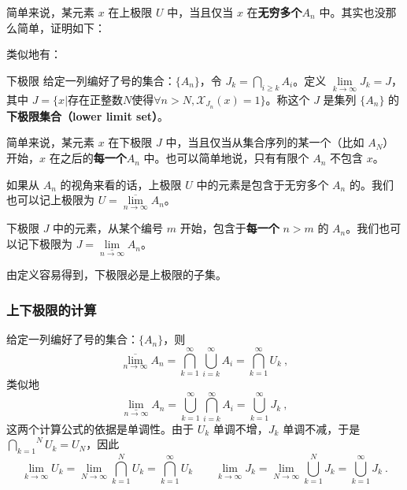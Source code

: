 简单来说，某元素 $x$ 在上极限 $U$ 中，当且仅当 $x$ 在\textbf{无穷多个}$A_n$ 中。其实也没那么简单，证明如下：



类似地有：

\begin{definition}{下极限}
给定一列编好了号的集合：$\{A_n\}$，令 $J_k=\underset{i\ge k}{\bigcap} A_i$。定义 $\lim\limits_{k\to\infty} J_k=J$，其中 $J=\{x|\text{存在正整数}N\text{使得}\forall n>N, \mathcal{X}_{J_n}(x)=1\}$。称这个 $J$ 是集列 $\{A_n\}$ 的\textbf{下极限集合（lower limit set）}。
\end{definition}

简单来说，某元素 $x$ 在下极限 $J$ 中，当且仅当从集合序列的某一个（比如 $A_N$）开始，$x$ 在之后的\textbf{每一个}$A_n$ 中。也可以简单地说，只有有限个 $A_n$ 不包含 $x$。

如果从 $A_n$ 的视角来看的话，上极限 $U$ 中的元素是包含于无穷多个 $A_n$ 的。我们也可以记上极限为 $U=\underset{n\to \infty}{\overline{\lim}} A_n$。

下极限 $J$ 中的元素，从某个编号 $m$ 开始，包含于\textbf{每一个} $n>m$ 的 $A_n$。我们也可以记下极限为 $J=\underset{n\to \infty}{\underline{\lim}}A_n$。

由定义容易得到，下极限必是上极限的子集。

\subsubsection{上下极限的计算}
给定一列编好了号的集合：$\{A_n\}$，则
\begin{equation}
\underset{n\to \infty}{\overline{\lim}} A_n = \overset {\infty}{\underset{k=1}{\bigcap}} \overset{\infty}{\underset{i=k}{\bigcup}} A_i = \overset{\infty}{\underset{k=1}{\bigcap}} U_k~,
\end{equation}
类似地
\begin{equation}
\underset{n\to \infty}{\underline{\lim}}A_n=\overset{\infty}{\underset{k=1}{\bigcup}}\overset{\infty}{\underset{i=k}{\bigcap}} A_i=\overset{\infty} {\underset{k=1}{\bigcup}} J_k~,
\end{equation}
这两个计算公式的依据是单调性。由于 $U_k$ 单调不增，$J_k$ 单调不减，于是 $\displaystyle \overset{N}{\underset{k=1}{\bigcap}}U_k=U_N$，因此
\begin{equation}
\lim_{k\to\infty}U_k=\lim\limits_{N\to\infty}\overset{N}{\underset{k=1}{\bigcap}} U_k=\overset{\infty}{\underset{k=1}{\bigcap}}U_k
\qquad
\lim\limits_{k\to\infty}J_k=\lim\limits_{N\to\infty}\overset{N}{\underset{k=1}{\bigcup}} J_k=\overset{\infty}{\underset{k=1}{\bigcup}} J_k~.
\end{equation}

